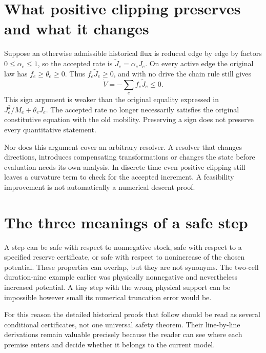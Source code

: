\section{What positive clipping preserves and what it changes}
Suppose an otherwise admissible historical flux is reduced edge by edge
by factors $0\leq\alpha_e\leq1$, so the accepted rate is
$\widetilde J_e=\alpha_eJ_e$. On every active edge the original law
has $f_e\geq\theta_e\geq0$. Thus
$f_e\widetilde J_e\geq0$, and with no drive the chain rule still gives
\begin{equation}
 \dot V=-\sum_e f_e\widetilde J_e\leq0.
\end{equation}
This sign argument is weaker than the original equality expressed in
$J_e^2/M_e+\theta_eJ_e$. The accepted rate no longer necessarily
satisfies the original constitutive equation with the old mobility.
Preserving a sign does not preserve every quantitative statement.

Nor does this argument cover an arbitrary resolver. A resolver that changes
directions, introduces compensating transformations or changes the state
before evaluation needs its own analysis. In discrete time even positive
clipping still leaves a curvature term to check for the accepted increment.
A feasibility improvement is not automatically a numerical descent proof.

\section{The three meanings of a safe step}
A step can be safe with respect to nonnegative stock, safe with respect
to a specified reserve certificate, or safe with respect to nonincrease
of the chosen potential. These properties can overlap, but they are not
synonyms. The two-cell duration-nine example earlier was physically
nonnegative and nevertheless increased potential. A tiny step with the
wrong physical support can be impossible however small its numerical
truncation error would be.

For this reason the detailed historical proofs that follow should be
read as several conditional certificates, not one universal safety
theorem. Their line-by-line derivations remain valuable precisely because
the reader can see where each premise enters and decide whether it belongs
to the current model.
